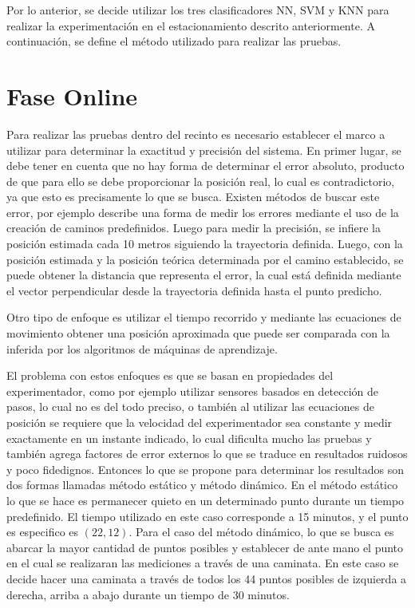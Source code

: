 Por lo anterior, se decide utilizar los tres clasificadores NN, SVM y KNN para realizar la experimentación en el estacionamiento descrito anteriormente. A continuación, se define el método utilizado para realizar las pruebas. 

\section{Fase Online}

Para realizar las pruebas dentro del recinto es necesario establecer el marco a utilizar para determinar la exactitud y precisión del sistema. En primer lugar, se debe tener en cuenta que no hay forma de determinar el error absoluto, producto de que para ello se debe proporcionar la posición real, lo cual es contradictorio, ya que esto es precisamente lo que se busca. Existen métodos de buscar este error, por ejemplo \citep{Ugave} describe una forma de medir los errores mediante el uso de la creación de caminos predefinidos. Luego para medir la precisión, se infiere la posición estimada cada 10 metros siguiendo la trayectoria definida. Luego, con la posición estimada y la posición teórica determinada por el camino establecido, se puede obtener la distancia que representa el error, la cual está definida mediante el vector perpendicular desde la trayectoria definida hasta el punto predicho. 

Otro tipo de enfoque es utilizar el tiempo recorrido y mediante las ecuaciones de movimiento obtener una posición aproximada que puede ser comparada con la inferida por los algoritmos de máquinas de aprendizaje.

El problema con estos enfoques es que se basan en propiedades del experimentador, como por ejemplo utilizar sensores basados en detección de pasos, lo cual no es del todo preciso, o también al utilizar las ecuaciones de posición se requiere que la velocidad del experimentador sea constante y medir exactamente en un instante indicado, lo cual dificulta mucho las pruebas y también agrega factores de error externos lo que se traduce en resultados ruidosos y poco fidedignos. Entonces lo que se propone para determinar los resultados son dos formas llamadas método estático y método dinámico. En el método estático lo que se hace es permanecer quieto en un determinado punto durante un tiempo predefinido. El tiempo utilizado en este caso corresponde a 15 minutos, y el punto es especifico es $(22, 12)$. Para el caso del método dinámico, lo que se busca es abarcar la mayor cantidad de puntos posibles y establecer de ante mano el punto en el cual se realizaran las mediciones a través de una caminata. En este caso se decide hacer una caminata a través de todos los 44 puntos posibles de izquierda a derecha, arriba a abajo durante un tiempo de 30 minutos.

